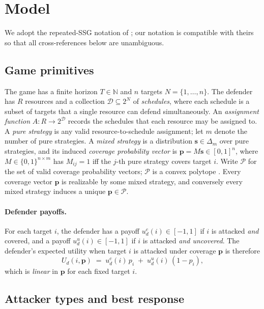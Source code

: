 \documentclass[letterpaper,9pt,twocolumn]{extarticle}
\newcommand{\pvec}{\mathbf{p}}
\newcommand{\svec}{\mathbf{s}}
\newcommand{\cP}{\mathcal{P}}
\newcommand{\NN}{\mathbb{N}}
\theoremstyle{plain}
\theoremstyle{definition}
\theoremstyle{remark}
\begin{document}
\section{Model}
\label{sec:model}

We adopt the repeated-SSG notation of \citet[\S 2]{balcan2015}; our
notation is compatible with theirs so that all cross-references below are
unambiguous.

\subsection{Game primitives}

The game has a finite horizon $T\in\NN$ and $n$ targets
$N=\{1,\dots,n\}$. The defender has $R$ resources and a collection
$\mathcal{D}\subseteq 2^N$ of \emph{schedules}, where each schedule is a
subset of targets that a single resource can defend simultaneously. An
\emph{assignment function} $A:R\to 2^{\mathcal{D}}$ records the schedules
that each resource may be assigned to. A \emph{pure strategy} is any valid
resource-to-schedule assignment; let $m$ denote the number of pure
strategies. A \emph{mixed strategy} is a distribution $\svec\in\Delta_m$
over pure strategies, and its induced \emph{coverage probability vector}
is $\pvec = M\svec\in [0,1]^n$, where $M\in\{0,1\}^{n\times m}$ has
$M_{ij}=1$ iff the $j$-th pure strategy covers target $i$. Write $\cP$ for
the set of valid coverage probability vectors; $\cP$ is a convex polytope
\citep[\S 2]{balcan2015}. Every coverage vector $\pvec$ is realizable by
some mixed strategy, and conversely every mixed strategy induces a unique
$\pvec\in\cP$.

\paragraph{Defender payoffs.}
For each target $i$, the defender has a payoff
$u_d^c(i)\in[-1,1]$ if $i$ is attacked \emph{and} covered, and a payoff
$u_d^u(i)\in[-1,1]$ if $i$ is attacked \emph{and uncovered}. The
defender's expected utility when target $i$ is attacked under coverage
$\pvec$ is therefore
\begin{equation}
U_d(i,\pvec)\;=\;u_d^c(i)\,p_i \;+\; u_d^u(i)\,(1-p_i),
\label{eq:Ud}
\end{equation}
which is \emph{linear} in $\pvec$ for each fixed target $i$.

\subsection{Attacker types and best response}
\end{document}

